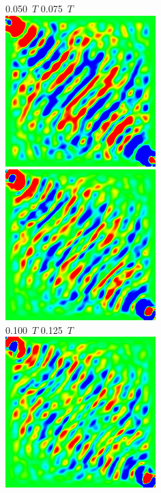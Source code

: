 \documentclass[a4j, twocolumn]{jsarticle}
\begin{document}
\begin{figure}
0.050\ $T$ \hspace*{0.25\hsize} 0.075\ $T$  \vspace{5pt}\\
\includegraphics[width=0.4\hsize]{./figures/capture/sqr/sinsqr128_32i_l_dif_7064} \ 
\includegraphics[width=0.4\hsize]{./figures/capture/sqr/sinsqr128_32i_l_dif_7066} \\
0.100\ $T$ \hspace*{0.25\hsize} 0.125\ $T$  \vspace{5pt}\\
\includegraphics[width=0.4\hsize]{./figures/capture/sqr/sinsqr128_32i_l_dif_7067} \ 

\end{figure}
\end{document}
